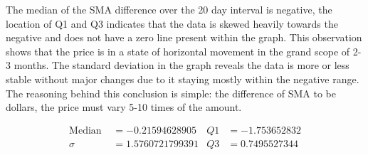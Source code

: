 \documentclass{article}
\begin{document}
\begin{figure}[h]
    \centering
\end{figure}

The median of the SMA difference over the 20 day interval is negative, the location of Q1 and Q3 indicates that the data is skewed heavily towards the negative and does not have a zero line present within the graph. This observation shows that the price is in a state of horizontal movement in the grand scope of 2-3 months. The standard deviation in the graph reveals the data is more or less stable without major changes due to it staying mostly within the negative range. The reasoning behind this conclusion is simple: the difference of SMA to be  dollars, the price must vary 5-10 times of the amount.

\begin{align*}
    \text{Median }&= -0.21594628905        &    Q1&=-1.753652832\\
    \sigma&=1.5760721799391        &  Q3&=0.7495527344
\end{align*}
\end{document}
